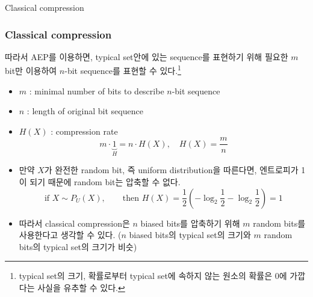 \documentclass[9pt]{beamer}
\begin{document}
\begin{section}{Classical compression}
        \begin{frame}
            \frametitle{Classical compression}
            따라서 AEP를 이용하면, typical set안에 있는 sequence를 표현하기 위해 필요한 $m$ bit만 이용하여 $n$-bit sequence를 표현할 수 있다.\footnote{typical set의 크기, 확률로부터 typical set에 속하지 않는 원소의 확률은 0에 가깝다는 사실을 유추할 수 있다.}
            \begin{itemize}
                \item $m$ : minimal number of bits to describe $n$-bit sequence
                \item $n$ : length of original bit sequence
                \item $H(X)$ : \alert{compression rate}
                \begin{equation*}
                    m \cdot \underbrace{1}_{H}= n \cdot H(X),\quad \boxed{H(X) = \frac{m}{n}}
                \end{equation*}
                \item 만약 $X$가 완전한 random bit, 즉 uniform distribution을 따른다면, 엔트로피가 1이 되기 때문에 random bit는 압축할 수 없다. 
                \begin{equation*}
                    \text{if } X \sim P_U(X), \qquad \text{then } H(X) = \frac{1}{2} (- \log_2 \frac{1}{2} - \log_2 \frac{1}{2}) = 1
                \end{equation*}
                \item 따라서 classical compression은 $n$ biased bits를 압축하기 위해 $m$ random bits를 사용한다고 생각할 수 있다. ($n$ biased bits의 typical set의 크기와 $m$ random bits의 typical set의 크기가 비슷)
            \end{itemize}
        
        \end{frame}
    \end{section}
\end{document}
